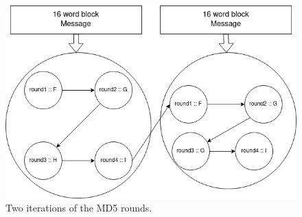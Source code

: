 \documentclass[a4paper]{article}
\begin{document}
\begin{enumerate}
\begin{figure}[htbp]
\centering
\includegraphics[width=.9\linewidth]{./Background/MD5rounds.png}
\caption{\label{fig:MD5}Two iterations of the MD5 rounds.}
\end{figure}


\end{enumerate}
\end{document}
